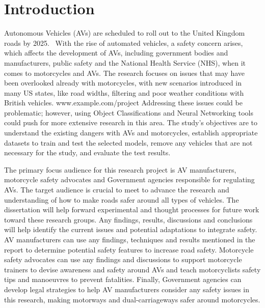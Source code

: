 \documentclass[12pt]{report} %
\begin{document}
\newpage %
\thispagestyle{empty}
\mbox{}


\clearpage
{} %

\chapter{Introduction}
	Autonomous Vehicles (AVs) are scheduled to roll out to the United Kingdom roads by 2025.~\cite{govuk_self-driving_2022} With the rise of automated vehicles, a safety concern arises, which affects the development of AVs, including government bodies and manufacturers, public safety and the National Health Service (NHS), when it comes to motorcycles and AVs. The research focuses on issues that may have been overlooked already with motorcycles, with new scenarios introduced in many US states, like road widths, filtering and poor weather conditions with British vehicles. 
	www.example.com/project
	Addressing these issues could be problematic; however, using Object Classifications and Neural Networking tools could push for more extensive research in this area. The study's objectives are to understand the existing dangers with AVs and motorcycles, establish appropriate datasets to train and test the selected models, remove any vehicles that are not necessary for the study, and evaluate the test results.

	The primary focus audience for this research project is AV manufacturers, motorcycle safety advocates and Government agencies responsible for regulating AVs. The target audience is crucial to meet to advance the research and understanding of how to make roads safer around all types of vehicles. The dissertation will help forward experimental and thought processes for future work toward these research groups. Any findings, results, discussions and conclusions will help identify the current issues and potential adaptations to integrate safety. AV manufacturers can use any findings, techniques and results mentioned in the report to determine potential safety features to increase road safety. Motorcycle safety advocates can use any findings and discussions to support motorcycle trainers to devise awareness and safety around AVs and teach motorcyclists safety tips and manoeuvres to prevent fatalities. Finally, Government agencies can develop legal strategies to help AV manufacturers consider any safety issues in this research, making motorways and dual-carriageways safer around motorcycles.
\end{document}

